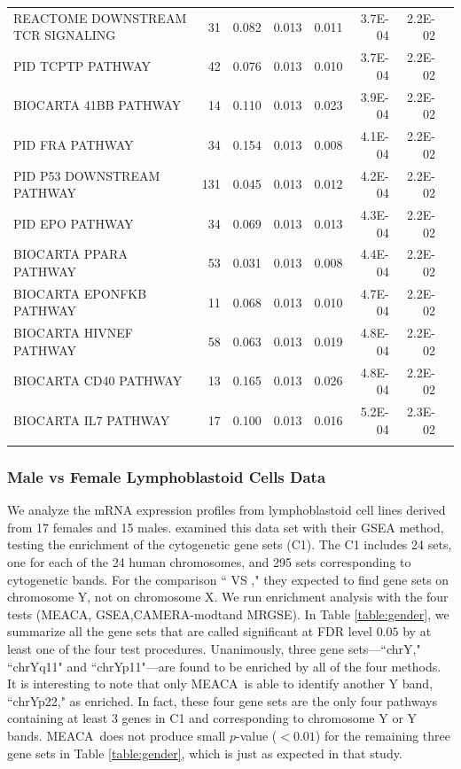 \documentclass[a4,center,fleqn]{NAR}
\newcommand{\OurMethod}{MEACA}
\newcommand{\CMT}{CAMERA-modt}
\newcommand{\genr}{MRGSE}
\begin{document}
\begin{table}[!ht]
\begin{tabular}{p{3in}rrrrrrr}
			REACTOME DOWNSTREAM TCR SIGNALING & 31 & 0.082 & 0.013 & 0.011 & 3.7E-04 & 2.2E-02 &  
			\\ 
			PID TCPTP PATHWAY & 42 & 0.076 & 0.013 & 0.010 & 3.7E-04 & 2.2E-02 &  \\ 
			BIOCARTA 41BB PATHWAY & 14 & 0.110 & 0.013 & 0.023 & 3.9E-04 & 2.2E-02 &  \\ 
			PID FRA PATHWAY & 34 & 0.154 & 0.013 & 0.008 & 4.1E-04 & 2.2E-02 &  \\ 
			PID P53 DOWNSTREAM PATHWAY & 131 & 0.045 & 0.013 & 0.012 & 4.2E-04 & 2.2E-02 &  \\ 
			PID EPO PATHWAY & 34 & 0.069 & 0.013 & 0.013 & 4.3E-04 & 2.2E-02 &  \\ 
			BIOCARTA PPARA PATHWAY & 53 & 0.031 & 0.013 & 0.008 & 4.4E-04 & 2.2E-02 &  \\ 
			BIOCARTA EPONFKB PATHWAY & 11 & 0.068 & 0.013 & 0.010 & 4.7E-04 & 2.2E-02 &  \\ 
			BIOCARTA HIVNEF PATHWAY & 58 & 0.063 & 0.013 & 0.019 & 4.8E-04 & 2.2E-02 &  \\ 
			BIOCARTA CD40 PATHWAY & 13 & 0.165 & 0.013 & 0.026 & 4.8E-04 & 2.2E-02 &  \\ 
			BIOCARTA IL7 PATHWAY & 17 & 0.100 & 0.013 & 0.016 & 5.2E-04 & 2.3E-02 &  \\ 
			\botrule
		\end{tabular}
			\label{table:top30}
		\end{table}
		
		
		
	
	
\subsubsection{Male vs Female Lymphoblastoid Cells Data}
	We analyze the mRNA expression profiles from lymphoblastoid cell lines derived from 17 females 
	and	15 males. \citet{subramanian2005gene} examined this data set with their GSEA method, 
	testing the enrichment of the  cytogenetic gene sets (C1). The C1 includes 24 sets, one for 
	each of the 24 human chromosomes, and 295 sets corresponding to cytogenetic bands. For the 
	comparison `` VS ," they expected to find gene sets on chromosome Y, 
	not on chromosome X. We run enrichment analysis with the four tests (\OurMethod, GSEA,\CMT and 
	\genr). In Table \ref{table:gender}, we summarize all the gene sets that are called significant 
	at FDR level $0.05$ by at least one of the four test procedures. Unanimously, three gene 
	sets---``chrY," ``chrYq11" and ``chrYp11"---are 
	found to be enriched by all of the four methods. It is interesting to note that only 
	\OurMethod~is able to identify another Y band, ``chrYp22," as enriched. In fact, these four 
	gene sets are the only four pathways containing at least 3 genes in  C1 and corresponding to 
	chromosome Y or Y bands. \OurMethod~does not produce small $p$-value ($<0.01$) for the 
	remaining three gene sets in Table \ref{table:gender}, which is just as expected in that study.
	
\end{document}
